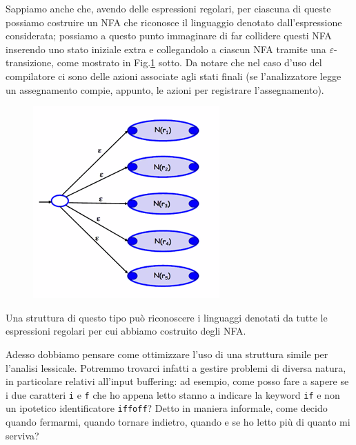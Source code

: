 \documentclass[class=book, crop=false, oneside, 12pt]{standalone}
\begin{document}
Sappiamo anche che, avendo delle espressioni regolari, per ciascuna di queste possiamo costruire un NFA che riconosce il linguaggio denotato dall'espressione considerata; possiamo a questo punto immaginare di far collidere questi NFA inserendo uno stato iniziale extra e collegandolo a ciascun NFA tramite una \(\varepsilon\)-transizione, come mostrato in Fig.\ref{nfa_for_grammar_regular_expressions} sotto.
Da notare che nel caso d'uso del compilatore ci sono delle azioni associate agli stati finali (se l'analizzatore legge un assegnamento compie, appunto, le azioni per registrare l'assegnamento).
\begin{figure}[H]
    \centering
    \includegraphics[width=.4\textwidth,keepaspectratio]{lec-14-2}
    \caption{}
    \label{nfa_for_grammar_regular_expressions}
\end{figure}
Una struttura di questo tipo può riconoscere i linguaggi denotati da tutte le espressioni regolari per cui abbiamo costruito degli NFA. 

Adesso dobbiamo pensare come ottimizzare l'uso di una struttura simile per l'analisi lessicale. Potremmo trovarci infatti a gestire problemi di diversa natura, in particolare relativi all'input buffering: ad esempio, come posso fare a sapere se i due caratteri \texttt{i} e \texttt{f} che ho appena letto stanno a indicare la keyword \texttt{if} e non un ipotetico identificatore \texttt{iffoff}? Detto in maniera informale, come decido quando fermarmi, quando tornare indietro, quando e se ho letto più di quanto mi serviva?
\end{document}
